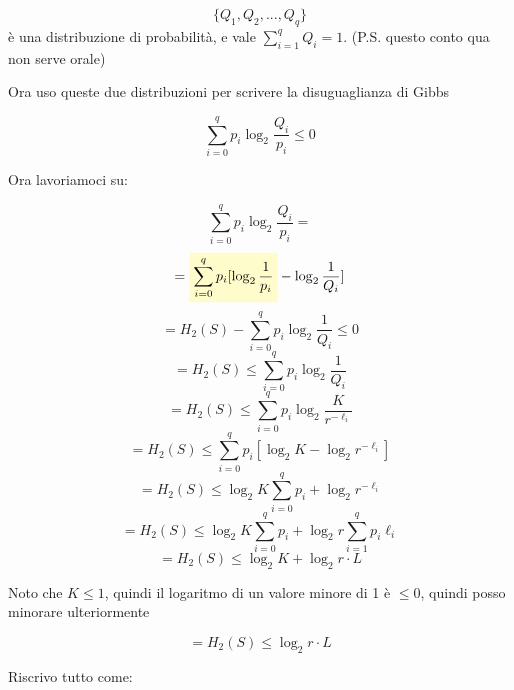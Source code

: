 \begin{equation*}
\{Q_1, Q_2, ..., Q_q\}
\end{equation*}
è una distribuzione di probabilità, e vale $\sum_{i=1}^qQ_i = 1$.
(P.S. questo conto qua non serve orale)

Ora uso queste due distribuzioni per scrivere la disuguaglianza di Gibbs

\begin{equation*}
\sum_{i=0}^qp_i\log_2\frac{Q_i}{p_i} \leq 0
\end{equation*}

Ora lavoriamoci su:

\begin{equation*}
\sum_{i=0}^qp_i\log_2\frac{Q_i}{p_i} =
\end{equation*}
\begin{equation*}
= \highlight{\sum_{i=0}^qp_i[\log_2\frac{1}{p_i}} - \log_2\frac{1}{Q_i}]
\end{equation*}
\begin{equation*}
= H_2(S) - \sum_{i=0}^qp_i\log_2\frac{1}{Q_i} \leq 0
\end{equation*}
\begin{equation*}
= H_2(S) \leq \sum_{i=0}^qp_i\log_2\frac{1}{Q_i}
\end{equation*}
\begin{equation*}
= H_2(S) \leq \sum_{i=0}^qp_i\log_2\frac{K}{r^{-\ell_i}}
\end{equation*}
\begin{equation*}
= H_2(S) \leq \sum_{i=0}^qp_i[\log_2K - \log_2{r^{-\ell_i}}]
\end{equation*}
\begin{equation*}
= H_2(S) \leq \log_2K \sum_{i=0}^qp_i + \log_2{r^{-\ell_i}}
\end{equation*}
\begin{equation*}
= H_2(S) \leq \log_2K \sum_{i=0}^qp_i + \log_2r\sum_{i=1}^qp_i\ell_i
\end{equation*}
\begin{equation*}
= H_2(S) \leq \log_2K + \log_2r \cdot L
\end{equation*}

Noto che $K \leq 1$, quindi il logaritmo di un valore minore di 1 è $\leq 0$, quindi posso minorare ulteriormente

\begin{equation*}
= H_2(S) \leq \log_2r \cdot L
\end{equation*}

Riscrivo tutto come:

